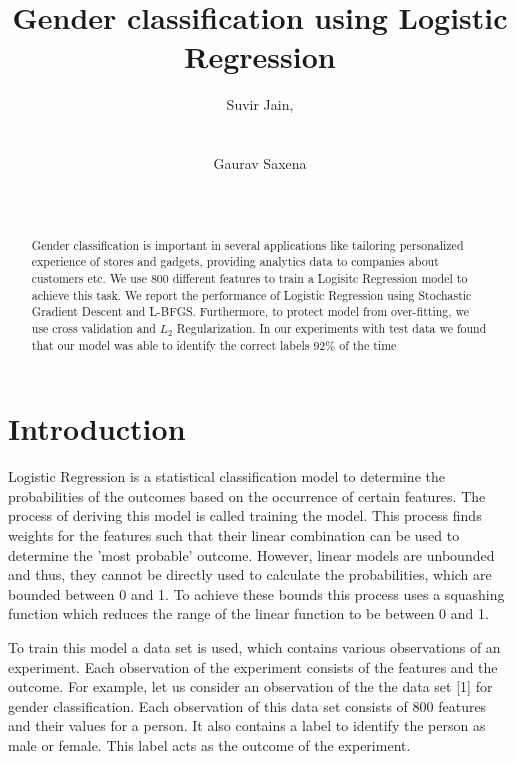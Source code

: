 \documentclass{acm_proc_article-sp}
\begin{document}
\title{Gender classification using Logistic Regression}

\author{
\alignauthor
Suvir Jain,\\
\\
\\
\alignauthor
Gaurav Saxena\\
\\
\\
}

\maketitle
\begin{abstract}
Gender classification is important in several applications like tailoring personalized experience of stores and gadgets, providing analytics data to companies about customers etc. We use 800 different features to train a Logisitc Regression model to achieve this task. We report the performance of Logistic Regression using Stochastic Gradient Descent and L-BFGS. Furthermore, to protect model from over-fitting, we use cross validation and $L_{2}$ Regularization. In our experiments with test data we found that our model was able to identify the correct labels 92\% of the time
\end{abstract}

\section{Introduction}

Logistic Regression is a statistical classification model to determine the probabilities of the outcomes based on the occurrence of certain features. The process of deriving this model is called training the model. This process finds weights for the features such that their linear combination can be used to determine the 'most probable' outcome. However, linear models are unbounded and thus, they cannot be directly used to calculate the probabilities, which are bounded between 0 and 1. To achieve these bounds this process uses a squashing function which reduces the range of the linear function to be between 0 and 1.

To train this model a data set is used, which contains various observations of an experiment. Each observation of the experiment consists of the features and the outcome. For example, let us consider an observation of the the data set [1] for gender classification. Each observation of this data set consists of 800 features and their values for a person. It also contains a label to identify the person as male or female. This label acts as the outcome of the experiment.
\end{document}
